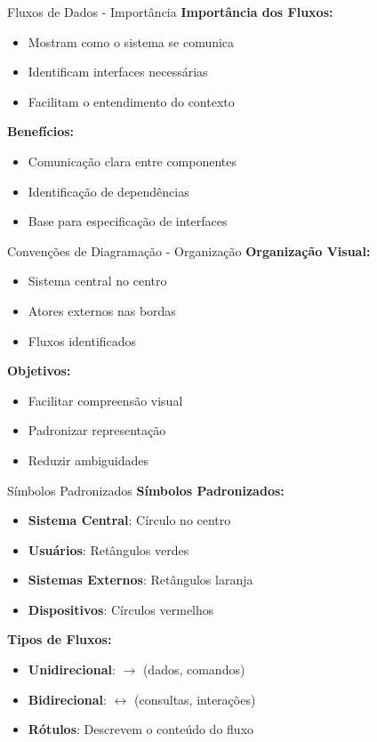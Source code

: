 \documentclass[aspectratio=169]{beamer}
\begin{document}
\begin{frame}{Fluxos de Dados - Importância}
\textbf{Importância dos Fluxos:}
\begin{itemize}
\item Mostram como o sistema se comunica
\item Identificam interfaces necessárias
\item Facilitam o entendimento do contexto
\end{itemize}

\vspace{0.5cm}
\textbf{Benefícios:}
\begin{itemize}
\item Comunicação clara entre componentes
\item Identificação de dependências
\item Base para especificação de interfaces
\end{itemize}
\end{frame}

\begin{frame}{Convenções de Diagramação - Organização}
\textbf{Organização Visual:}
\begin{itemize}
\item Sistema central no centro
\item Atores externos nas bordas
\item Fluxos identificados
\end{itemize}

\vspace{0.5cm}
\textbf{Objetivos:}
\begin{itemize}
\item Facilitar compreensão visual
\item Padronizar representação
\item Reduzir ambiguidades
\end{itemize}
\end{frame}

\begin{frame}{Símbolos Padronizados}
\textbf{Símbolos Padronizados:}
\begin{itemize}
\item \textbf{Sistema Central}: Círculo no centro
\item \textbf{Usuários}: Retângulos verdes
\item \textbf{Sistemas Externos}: Retângulos laranja
\item \textbf{Dispositivos}: Círculos vermelhos
\end{itemize}

\vspace{0.3cm}
\textbf{Tipos de Fluxos:}
\begin{itemize}
\item \textbf{Unidirecional}: $\rightarrow$ (dados, comandos)
\item \textbf{Bidirecional}: $\leftrightarrow$ (consultas, interações)
\item \textbf{Rótulos}: Descrevem o conteúdo do fluxo
\end{itemize}
\end{frame}
\end{document}
